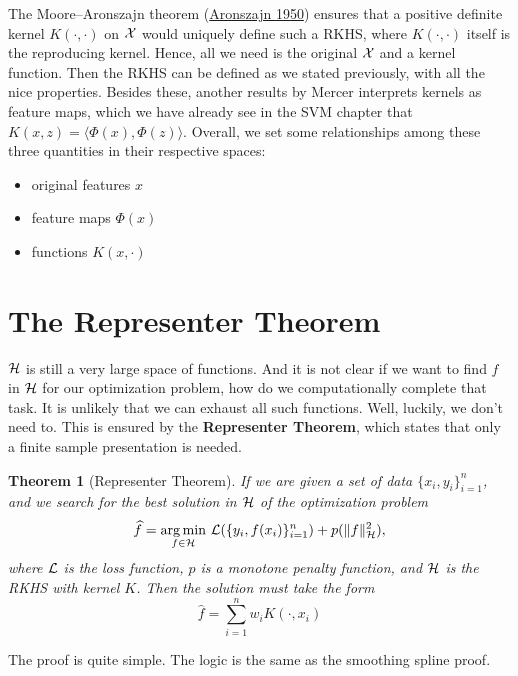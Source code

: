 \documentclass[
]{book}
\providecommand{\tightlist}{%
  \setlength{\itemsep}{0pt}\setlength{\parskip}{0pt}}
\newtheorem{theorem}{Theorem}[chapter]
\theoremstyle{definition}
\theoremstyle{definition}
\theoremstyle{definition}
\theoremstyle{definition}
\theoremstyle{remark}
\begin{document}
The Moore--Aronszajn theorem (\protect\hyperlink{ref-aronszajn1950theory}{Aronszajn 1950}) ensures that a positive definite kernel \(K(\cdot, \cdot)\) on \(\cal X\) would uniquely define such a RKHS, where \(K(\cdot, \cdot)\) itself is the reproducing kernel. Hence, all we need is the original \(\cal X\) and a kernel function. Then the RKHS can be defined as we stated previously, with all the nice properties. Besides these, another results by Mercer interprets kernels as feature maps, which we have already see in the SVM chapter that \(K(x, z)= \langle \Phi(x), \Phi(z) \rangle\). Overall, we set some relationships among these three quantities in their respective spaces:

\begin{itemize}
\tightlist
\item
  original features \(x\)
\item
  feature maps \(\Phi(x)\)
\item
  functions \(K(x, \cdot)\)
\end{itemize}

\hypertarget{the-representer-theorem}{%
\section{The Representer Theorem}\label{the-representer-theorem}}

\(\cal H\) is still a very large space of functions. And it is not clear if we want to find \(f\) in \(\cal H\) for our optimization problem, how do we computationally complete that task. It is unlikely that we can exhaust all such functions. Well, luckily, we don't need to. This is ensured by the \textbf{Representer Theorem}, which states that only a finite sample presentation is needed.

\begin{theorem}[Representer Theorem]
\protect\hypertarget{thm:unnamed-chunk-209}{}\label{thm:unnamed-chunk-209}If we are given a set of data \(\{x_i, y_i\}_{i=1}^n\), and we search for the best solution in \({\cal H}\) of the optimization problem
\[\widehat f = \underset{f \in \cal H}{\arg\min} \,\, {\cal L}(\{y_i, f(x_i)\}_{i=1}^n) + p(\| f \|_{{\cal H}}^2 ),\]
where \({\cal L}\) is the loss function, \(p\) is a monotone penalty function, and \({\cal H}\) is the RKHS with kernel \(K\). Then the solution must take the form
\[\widehat f = \sum_{i=1}^n w_i K(\cdot, x_i)\]
\end{theorem}

The proof is quite simple. The logic is the same as the smoothing spline proof.
\end{document}
